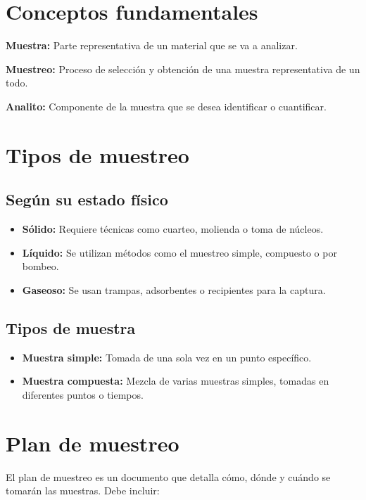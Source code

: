 \section{Conceptos fundamentales}

\textbf{Muestra:} Parte representativa de un material que se va a analizar. 

\textbf{Muestreo:} Proceso de selección y obtención de una muestra representativa de un todo.

\textbf{Analito:} Componente de la muestra que se desea identificar o cuantificar.


\section{Tipos de muestreo}

\subsection{Según su estado físico}

\begin{itemize}
    \item \textbf{Sólido:} Requiere técnicas como cuarteo, molienda o toma de núcleos.
    \item \textbf{Líquido:} Se utilizan métodos como el muestreo simple, compuesto o por bombeo.
    \item \textbf{Gaseoso:} Se usan trampas, adsorbentes o recipientes para la captura.
\end{itemize}

\subsection{Tipos de muestra}

\begin{itemize}
    \item \textbf{Muestra simple:} Tomada de una sola vez en un punto específico.
    \item \textbf{Muestra compuesta:} Mezcla de varias muestras simples, tomadas en diferentes puntos o tiempos.
\end{itemize}

\section{Plan de muestreo}

El plan de muestreo es un documento que detalla cómo, dónde y cuándo se tomarán las muestras. Debe incluir:

